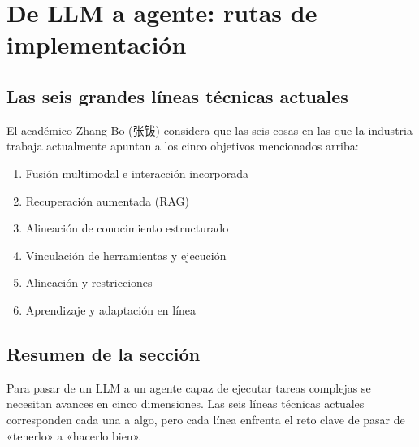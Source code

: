 \section{De LLM a agente: rutas de implementación}

\subsection{Las seis grandes líneas técnicas actuales}

El académico Zhang Bo (张钹) considera que las seis cosas en las que la industria trabaja actualmente apuntan a los cinco objetivos mencionados arriba:

\begin{enumerate}
\item Fusión multimodal e interacción incorporada
\item Recuperación aumentada (RAG)
\item Alineación de conocimiento estructurado
\item Vinculación de herramientas y ejecución
\item Alineación y restricciones
\item Aprendizaje y adaptación en línea
\end{enumerate}

\subsection{Resumen de la sección}

Para pasar de un LLM a un agente capaz de ejecutar tareas complejas se necesitan avances en cinco dimensiones. Las seis líneas técnicas actuales corresponden cada una a algo, pero cada línea enfrenta el reto clave de pasar de «tenerlo» a «hacerlo bien».

